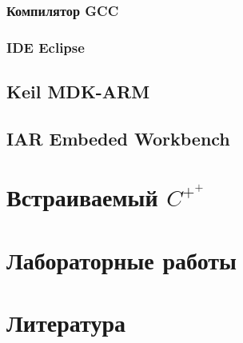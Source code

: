 \documentclass[oneside,12pt]{book}
\newcommand{\cpp}{$C^{+^{+}}$}
\begin{document}
\section{Компилятор GCC}
\section{IDE Eclipse}
\chapter{Keil MDK-ARM}
\chapter{IAR Embeded Workbench}

\part{Встраиваемый \cpp}

\part{Лабораторные работы}

\part{Литература}
\end{document}
